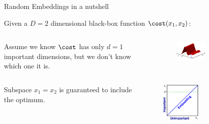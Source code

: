 \begin{frame}[c]{Random Embeddings in a nutshell}


Given a $D=2$ dimensional black-box function $\cost(x_{1},x_{2})$:
\begin{itemize}
\begin{columns}[T]
\begin{column}{0.45\linewidth}


    \item Assume we know $\cost$ has only $d=1$ important dimensions, but we don't know which one it is.
    \end{column}
    \begin{column}{0.5\linewidth}
        \begin{figure}
    \includegraphics[width=0.5\textwidth]{images/highdim_images/Random embeddings in a nutshell1.png}
    \end{figure}
    \end{column}
\end{columns}
    \pause
    \begin{columns}[T]
    \begin{column}{0.45\linewidth}
    \vspace{-1em}
    \item Subspace $x_1=x_2$ is guaranteed to include the optimum.
        \end{column}
        \begin{column}{0.5\linewidth}
    \begin{figure}
    \includegraphics[width=0.5\textwidth]{images/highdim_images/Random embeddings in a nutshell2.png}

\end{figure}
\end{column}
\end{columns}
\end{itemize}
\end{frame}
